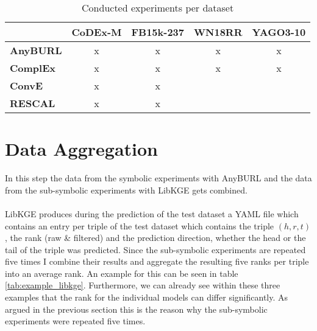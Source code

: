 \begin{table}[H]
\centering
\begin{tabular}{l|cccc}
 & \multicolumn{1}{l}{\textbf{CoDEx-M}} & \multicolumn{1}{l}{\textbf{FB15k-237}} & \multicolumn{1}{l}{\textbf{WN18RR}} & \multicolumn{1}{l}{\textbf{YAGO3-10}} \\ \hline
\textbf{AnyBURL} & x & x & x & x \\
\textbf{ComplEx} & x & x & x & x \\
\textbf{ConvE} & x & x &  &  \\
\textbf{RESCAL} & x & x &  & 
\end{tabular}
\caption{Conducted experiments per dataset}
\label{tab:dataset_models}
\end{table}

\section{Data Aggregation}
In this step the data from the symbolic experiments with AnyBURL and the data from the sub-symbolic experiments with LibKGE gets combined. 
\\ \\
LibKGE produces during the prediction of the test dataset a YAML file which contains an entry per triple of the test dataset which contains the triple $(h,r,t)$, the rank (raw \& filtered) and the prediction direction, whether the head or the tail of the triple was predicted. Since the sub-symbolic experiments are repeated five times I combine their results and aggregate the resulting five ranks per triple into an average rank. An example for this can be seen in table \ref{tab:example_libkge}. Furthermore, we can already see within these three examples that the rank for the individual models can differ significantly. As argued in the previous section this is the reason why the sub-symbolic experiments were repeated five times.

